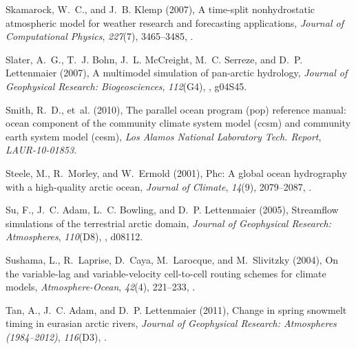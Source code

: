 \documentclass[jgrga, draft]{agutex}
\begin{document}
\begin{article}
\begin{thebibliography}{79}
Skamarock, W.~C., and J.~B. Klemp (2007), A time-split nonhydrostatic
  atmospheric model for weather research and forecasting applications,
  \textit{Journal of Computational Physics}, \textit{227}(7), 3465--3485,
  .

Slater, A.~G., T.~J. Bohn, J.~L. McCreight, M.~C. Serreze, and D.~P.
  Lettenmaier (2007), A multimodel simulation of pan-arctic hydrology,
  \textit{Journal of Geophysical Research: Biogeosciences}, \textit{112}(G4),
  , g04S45.

Smith, R.~D., et~al. (2010), The parallel ocean program (pop) reference manual:
  ocean component of the community climate system model (ccsm) and community
  earth system model (cesm), \textit{Los Alamos National Laboratory Tech.
  Report}, \textit{LAUR-10-01853}.

Steele, M., R.~Morley, and W.~Ermold (2001), Phc: A global ocean hydrography
  with a high-quality arctic ocean, \textit{Journal of Climate},
  \textit{14}(9), 2079--2087,
  .

Su, F., J.~C. Adam, L.~C. Bowling, and D.~P. Lettenmaier (2005), Streamflow
  simulations of the terrestrial arctic domain, \textit{Journal of Geophysical
  Research: Atmospheres}, \textit{110}(D8), , d08112.

Sushama, L., R.~Laprise, D.~Caya, M.~Larocque, and M.~Slivitzky (2004), On the
  variable-lag and variable-velocity cell-to-cell routing schemes for climate
  models, \textit{Atmosphere-Ocean}, \textit{42}(4), 221--233,
  .

Tan, A., J.~C. Adam, and D.~P. Lettenmaier (2011), Change in spring snowmelt
  timing in eurasian arctic rivers, \textit{Journal of Geophysical Research:
  Atmospheres (1984--2012)}, \textit{116}(D3), .


\end{thebibliography}
\end{article}
\end{document}
